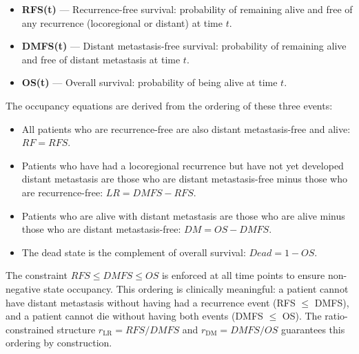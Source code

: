 \documentclass[11pt,a4paper]{article}
\begin{document}
\begin{itemize}
    \item \textbf{RFS(t)} --- Recurrence-free survival: probability of remaining alive and free of any recurrence (locoregional or distant) at time $t$.
    \item \textbf{DMFS(t)} --- Distant metastasis-free survival: probability of remaining alive and free of distant metastasis at time $t$.
    \item \textbf{OS(t)} --- Overall survival: probability of being alive at time $t$.
\end{itemize}

The occupancy equations are derived from the ordering of these three events:
\begin{itemize}
    \item All patients who are recurrence-free are also distant metastasis-free and alive: $RF = RFS$.
    \item Patients who have had a locoregional recurrence but have not yet developed distant metastasis are those who are distant metastasis-free minus those who are recurrence-free: $LR = DMFS - RFS$.
    \item Patients who are alive with distant metastasis are those who are alive minus those who are distant metastasis-free: $DM = OS - DMFS$.
    \item The dead state is the complement of overall survival: $Dead = 1 - OS$.
\end{itemize}

The constraint $RFS \leq DMFS \leq OS$ is enforced at all time points to ensure non-negative state occupancy. This ordering is clinically meaningful: a patient cannot have distant metastasis without having had a recurrence event (RFS $\leq$ DMFS), and a patient cannot die without having both events (DMFS $\leq$ OS). The ratio-constrained structure $r_{\text{LR}} = RFS/DMFS$ and $r_{\text{DM}} = DMFS/OS$ guarantees this ordering by construction.
\end{document}
